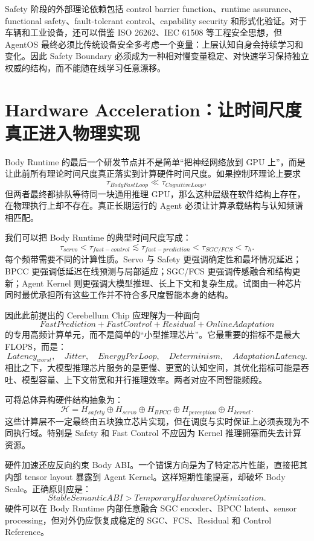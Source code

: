 Safety 阶段的外部理论依赖包括 control barrier function、runtime assurance、functional safety、fault-tolerant control、capability security 和形式化验证。对于车辆和工业设备，还可以借鉴 ISO 26262、IEC 61508 等工程安全思想，但 AgentOS 最终必须比传统设备安全多考虑一个变量：上层认知自身会持续学习和变化。因此 Safety Boundary 必须成为一种相对慢变量稳定、对快速学习保持独立权威的结构，而不能随在线学习任意漂移。

\section{Hardware Acceleration：让时间尺度真正进入物理实现}

Body Runtime 的最后一个研发节点并不是简单“把神经网络放到 GPU 上”，而是让此前所有理论时间尺度真正落实到计算硬件时间尺度。如果控制环理论上要求
\[
\tau_{BodyFastLoop}\ll\tau_{CognitiveLoop},
\]
但两者最终都排队等待同一块通用推理 GPU，那么这种层级在软件结构上存在，在物理执行上却不存在。真正长期运行的 Agent 必须让计算承载结构与认知频谱相匹配。

我们可以把 Body Runtime 的典型时间尺度写成：
\[
\tau_{servo}
<
\tau_{fast-control}
\lesssim
\tau_{fast-prediction}
<
\tau_{SGC/FCS}
<
\tau_h.
\]
每个频带需要不同的计算性质。Servo 与 Safety 更强调确定性和最坏情况延迟；BPCC 更强调低延迟在线预测与局部适应；SGC/FCS 更强调传感融合和结构更新；Agent Kernel 则更强调大模型推理、长上下文和复杂生成。试图由一种芯片同时最优承担所有这些工作并不符合多尺度智能本身的结构。

因此此前提出的 Cerebellum Chip 应理解为一种面向
\[
FastPrediction+
FastControl+
Residual+
OnlineAdaptation
\]
的专用高频计算单元，而不是简单的“小型推理芯片”。它最重要的指标不是最大 FLOPS，而是：
\[
Latency_{worst},
\quad
Jitter,
\quad
EnergyPerLoop,
\quad
Determinism,
\quad
AdaptationLatency.
\]
相比之下，大模型推理芯片服务的是更慢、更宽的认知空间，其优化指标可能是吞吐、模型容量、上下文带宽和并行推理效率。两者对应不同智能频段。

可将总体异构硬件结构抽象为：
\[
\mathcal H
=
H_{safety}
\oplus
H_{servo}
\oplus
H_{BPCC}
\oplus
H_{perception}
\oplus
H_{kernel}.
\]
这些计算层不一定最终由五块独立芯片实现，但在调度与实时保证上必须表现为不同执行域。特别是 Safety 和 Fast Control 不应因为 Kernel 推理拥塞而失去计算资源。

硬件加速还应反向约束 Body ABI。一个错误方向是为了特定芯片性能，直接把其内部 tensor layout 暴露到 Agent Kernel。这样短期性能提高，却破坏 Body Scale。正确原则应是：
\[
\boxed{
StableSemanticABI
>
TemporaryHardwareOptimization.
}
\]
硬件可以在 Body Runtime 内部任意融合 SGC encoder、BPCC latent、sensor processing，但对外仍应恢复成稳定的 SGC、FCS、Residual 和 Control Reference。

